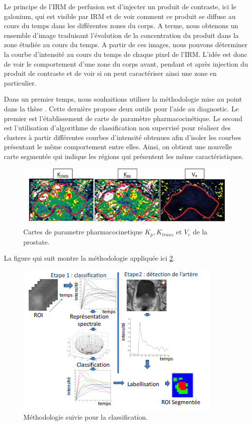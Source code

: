 Le principe de l'IRM de perfusion est d'injecter un produit de contraste, ici le galonium, qui est visible par IRM et de voir comment ce produit se diffuse au cours du temps dans les différentes zones du corps. A terme, nous obtenons un ensemble d'image traduisant l'évolution de la concentration du produit dans la zone étudiée au cours du temps. A partir de ces images, nous pouvons déterminer la courbe d'intensité au cours du temps de chaque pixel de l'IRM. L'idée est donc de voir le comportement d'une zone du corps avant, pendant et après injection du produit de contraste et de voir si on peut caractériser ainsi une zone en particulier.

Dans un premier temps, nous souhaitions utiliser la méthodologie mise au point dans la thèse \cite{tartare2014contribution}. Cette dernière propose deux outils pour l'aide au diagnostic. Le premier est l'établissement de carte de paramètre pharmacocinétique. Le second est l'utilisation d'algorithme de classification non supervisé pour réaliser des clusters à partir différentes courbes d'intensité obtenues afin d'isoler les courbes présentant le même comportement entre elles. Ainsi, on obtient une nouvelle carte segmentée qui indique les régions qui présentent les même caractéristiques.

\begin{figure}[H]
\centering
    \includegraphics[scale=0.6,angle=0]{Images/CatreDeParametresPharmacocinetique.png}
    \caption{Cartes de parametre pharmacocinetique $K_p, K_{trans}$ et $V_e$ de la prostate.}
    \label{fig:CarteDeParametresPharmacocinetique}
\end{figure}

La figure qui suit montre la méthodologie appliquée ici \ref{fig:Classif}.
 
\begin{figure}[H]
\centering
    \includegraphics[scale=1,angle=0]{Images/Classif.png}
    \caption{Méthodologie suivie pour la classification.}
    \label{fig:Classif}
\end{figure}

